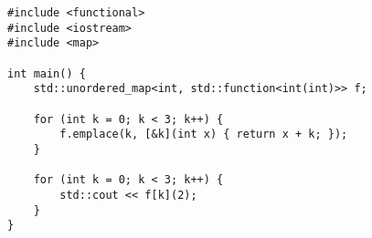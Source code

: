 \begin{lstlisting}[title=\href{https://godbolt.org/z/p97MXD}{\texttt{godbolt.org/z/p97MXD}}]
#include <functional>
#include <iostream>
#include <map>

int main() {
    std::unordered_map<int, std::function<int(int)>> f;
    
    for (int k = 0; k < 3; k++) {
        f.emplace(k, [&k](int x) { return x + k; });
    }

    for (int k = 0; k < 3; k++) {
        std::cout << f[k](2);
    }
}
\end{lstlisting}
